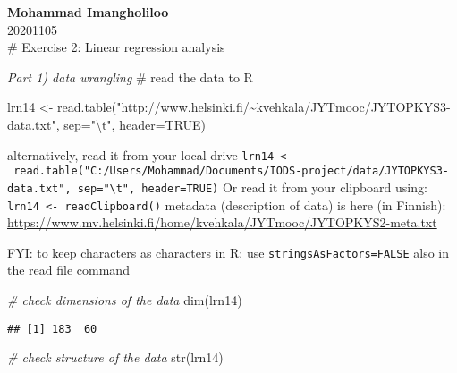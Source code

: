 \documentclass[
]{article}
\newenvironment{Shaded}{\begin{snugshade}}{\end{snugshade}}
\newcommand{\AttributeTok}[1]{\textcolor[rgb]{0.77,0.63,0.00}{#1}}
\newcommand{\CommentTok}[1]{\textcolor[rgb]{0.56,0.35,0.01}{\textit{#1}}}
\newcommand{\ConstantTok}[1]{\textcolor[rgb]{0.00,0.00,0.00}{#1}}
\newcommand{\FunctionTok}[1]{\textcolor[rgb]{0.00,0.00,0.00}{#1}}
\newcommand{\NormalTok}[1]{#1}
\newcommand{\OtherTok}[1]{\textcolor[rgb]{0.56,0.35,0.01}{#1}}
\newcommand{\SpecialCharTok}[1]{\textcolor[rgb]{0.00,0.00,0.00}{#1}}
\newcommand{\StringTok}[1]{\textcolor[rgb]{0.31,0.60,0.02}{#1}}
\begin{document}
\textbf{Mohammad Imangholiloo}\\
20201105\\
\# Exercise 2: Linear regression analysis

\emph{Part 1) data wrangling} \# read the data to R

\begin{Shaded}
\begin{Highlighting}[]
\NormalTok{lrn14 }\OtherTok{\textless{}{-}} \FunctionTok{read.table}\NormalTok{(}\StringTok{"http://www.helsinki.fi/\textasciitilde{}kvehkala/JYTmooc/JYTOPKYS3{-}data.txt"}\NormalTok{, }\AttributeTok{sep=}\StringTok{"}\SpecialCharTok{\textbackslash{}t}\StringTok{"}\NormalTok{, }\AttributeTok{header=}\ConstantTok{TRUE}\NormalTok{)}
\end{Highlighting}
\end{Shaded}

alternatively, read it from your local drive
\texttt{lrn14\ \textless{}-\ read.table("C:/Users/Mohammad/Documents/IODS-project/data/JYTOPKYS3-data.txt",\ sep="\textbackslash{}t",\ header=TRUE)}
Or read it from your clipboard using:
\texttt{lrn14\ \textless{}-\ readClipboard()} metadata (description of
data) is here (in Finnish):
\url{https://www.mv.helsinki.fi/home/kvehkala/JYTmooc/JYTOPKYS2-meta.txt}

FYI: to keep characters as characters in R: use
\texttt{stringsAsFactors=FALSE} also in the read file command

\begin{Shaded}
\begin{Highlighting}[]
\CommentTok{\# check dimensions of the data}
\FunctionTok{dim}\NormalTok{(lrn14)}
\end{Highlighting}
\end{Shaded}

\begin{verbatim}
## [1] 183  60
\end{verbatim}

\begin{Shaded}
\begin{Highlighting}[]
\CommentTok{\# check structure of the data}
\FunctionTok{str}\NormalTok{(lrn14)}
\end{Highlighting}
\end{Shaded}
\end{document}
